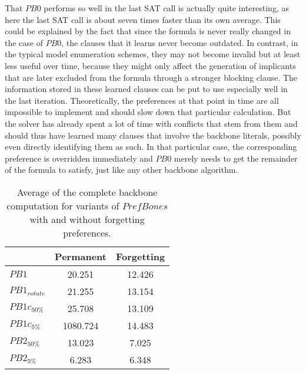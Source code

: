 That $PB0$ performs so well in the last SAT call is actually quite interesting, as here the last SAT call is about seven times faster than its own average. This could be explained by the fact that since the formula is never really changed in the case of $PB0$, the clauses that it learns never become outdated. In contrast, in the typical model enumeration schemes, they may not become invalid but at least less useful over time, because they might only affect the generation of implicants that are later excluded from the formula through a stronger blocking clause. The information stored in these learned clauses can be put to use especially well in the last iteration. Theoretically, the preferences at that point in time are all impossible to implement and should slow down that particular calculation. 
But the solver has already spent a lot of time with conflicts that stem from them and should thus have learned many clauses that involve the backbone literals, possibly even directly identifying them as such. In that particular case, the corresponding preference is overridden immediately and $PB0$ merely needs to get the remainder of the formula to satisfy, just like any other backbone algorithm.




\begin{wraptable}[14]{r}{7cm} %
\begin{tabular}{l| c c }
 & Permanent & Forgetting  \\
\hline
$PB1$ &	20.251 & 12.426 \\
$PB1_{rotate}$ & 21.255 & 13.154 \\
$PB1c_{50\%}$ & 25.708 & 13.109 \\
$PB1c_{5\%}$ & 1080.724 & 14.483 \\
$PB2_{50\%}$ & 13.023 & 7.025 \\
$PB2_{5\%}$ & 6.283 & 6.348 \\
\end{tabular}
\caption[Benefit of forgetting preferences]{Average of the complete backbone computation for variants of $PrefBones$ with and without forgetting preferences.}
\label{tab:satCompForgettingBenefits}
\end{wraptable}


